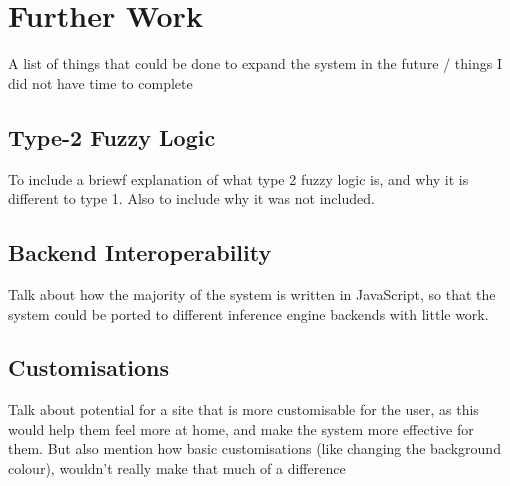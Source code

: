 \section{Further Work}
{\color{red} A list of things that could be done to expand the system in the future / things I did not have time to complete }

\subsection{Type-2 Fuzzy Logic}
\label{sec:type2}

{\color{red} To include a briewf explanation of what type 2 fuzzy logic is, and why it is different to type 1. Also to include why it was not included.}

\subsection{Backend Interoperability}
{\color{red} Talk about how the majority of the system is written in JavaScript, so that the system could be ported to different inference engine backends with little work.}

\subsection{Customisations}

{\color{red} 
Talk about potential for a site that is more customisable for the user, as this would help them feel more at home, and make the system more effective for them. But also mention how basic customisations (like changing the background colour), wouldn't really make that much of a difference}